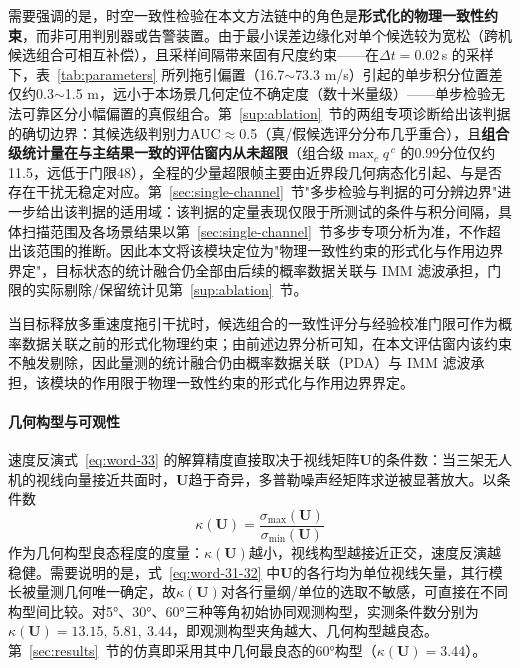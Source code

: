 \documentclass[UTF8,a4paper,zihao=-4]{ctexart}
\begin{document}
需要强调的是，时空一致性检验在本文方法链中的角色是\textbf{形式化的物理一致性约束}，而非可用判别器或告警装置。由于最小误差边缘化对单个候选较为宽松（跨机候选组合可相互补偿），且采样间隔带来固有尺度约束——在\(\Delta t=0.02\)\,s 的采样下，表~\ref{tab:parameters} 所列拖引偏置（16.7$\sim$73.3 m/s）引起的单步积分位置差仅约0.3$\sim$1.5 m，远小于本场景几何定位不确定度（数十米量级）——单步检验无法可靠区分小幅偏置的真假组合。第~\ref{sup:ablation}~节的两组专项诊断给出该判据的确切边界：其候选级判别力AUC$\approx$0.5（真/假候选评分分布几乎重合），且\textbf{组合级统计量在与主结果一致的评估窗内从未超限}（组合级$\max_c q^{\,c}$ 的0.99分位仅约11.5，远低于门限48），全程的少量超限帧主要由近界段几何病态化引起、与是否存在干扰无稳定对应。第~\ref{sec:single-channel}~节"多步检验与判据的可分辨边界"进一步给出该判据的适用域：该判据的定量表现仅限于所测试的条件与积分间隔，具体扫描范围及各场景结果以第~\ref{sec:single-channel}~节多步专项分析为准，不作超出该范围的推断。因此本文将该模块定位为"物理一致性约束的形式化与作用边界界定"，目标状态的统计融合仍全部由后续的概率数据关联与 IMM 滤波承担，门限的实际剔除/保留统计见第~\ref{sup:ablation}~节。

当目标释放多重速度拖引干扰时，候选组合的一致性评分与经验校准门限可作为概率数据关联之前的形式化物理约束；由前述边界分析可知，在本文评估窗内该约束不触发剔除，因此量测的统计融合仍由概率数据关联（PDA）与 IMM 滤波承担，该模块的作用限于物理一致性约束的形式化与作用边界界定。

\paragraph{几何构型与可观性}

速度反演式~\eqref{eq:word-33} 的解算精度直接取决于视线矩阵\(\boldsymbol{U}\)的条件数：当三架无人机的视线向量接近共面时，\(\boldsymbol{U}\)趋于奇异，多普勒噪声经矩阵求逆被显著放大。以条件数
\begin{equation}
\kappa(\boldsymbol{U})=\frac{\sigma_{\max}(\boldsymbol{U})}{\sigma_{\min}(\boldsymbol{U})}
\label{eq:condU}
\end{equation}
作为几何构型良态程度的度量：\(\kappa(\boldsymbol{U})\)越小，视线构型越接近正交，速度反演越稳健。需要说明的是，式~\eqref{eq:word-31-32} 中\(\boldsymbol{U}\)的各行均为单位视线矢量，其行模长被量测几何唯一确定，故\(\kappa(\boldsymbol{U})\)对各行量纲/单位的选取不敏感，可直接在不同构型间比较。对5°、30°、60°三种等角初始协同观测构型，实测条件数分别为\(\kappa(\boldsymbol{U})=13.15,\ 5.81,\ 3.44\)，即观测构型夹角越大、几何构型越良态。第~\ref{sec:results}~节的仿真即采用其中几何最良态的60°构型（\(\kappa(\boldsymbol{U})=3.44\)）。
\end{document}
